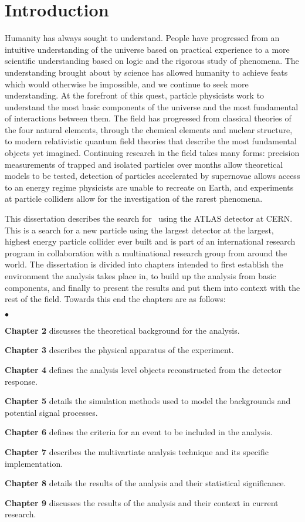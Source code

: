 \chapter{Introduction}
\label{SECTION-INTRO}
Humanity has always sought to understand. People have progressed from an intuitive understanding of the universe based on practical experience to a more scientific understanding based on logic and the rigorous study of phenomena. The understanding brought about by science has allowed humanity to achieve feats which would otherwise be impossible, and we continue to seek more understanding. At the forefront of this quest, particle physicists work to understand the most basic components of the universe and the most fundamental of interactions between them. The field has progressed from classical theories of the four natural elements, through the chemical elements and nuclear structure, to modern relativistic quantum field theories that describe the most fundamental objects yet imagined. Continuing research in the field takes many forms: precision measurements of trapped and isolated particles over months allow theoretical models to be tested, detection of particles accelerated by supernovae allows access to an energy regime physicists are unable to recreate on Earth, and experiments at particle colliders allow for the investigation of the rarest phenomena.

This dissertation describes the search for \Wprimechan\ using the ATLAS detector at CERN. This is a search for a new particle using the largest detector at the largest, highest energy particle collider ever built and is part of an international research program in collaboration with a multinational research group from around the world. The dissertation is divided into chapters intended to first establish the environment the analysis takes place in, to build up the analysis from basic components, and finally to present the results and put them into context with the rest of the field. Towards this end the chapters are as follows:

\begin{list}{$\bullet$}{}
\item \textbf{Chapter 2} discusses the theoretical background for the analysis.
\item \textbf{Chapter 3} describes the physical apparatus of the experiment.
\item \textbf{Chapter 4} defines the analysis level objects reconstructed from the detector response.
\item \textbf{Chapter 5} details the simulation methods used to model the backgrounds and potential signal processes.
\item \textbf{Chapter 6} defines the criteria for an event to be included in the analysis.
\item \textbf{Chapter 7} describes the multivartiate analysis technique and its specific implementation.
\item \textbf{Chapter 8} details the results of the analysis and their statistical significance.
\item \textbf{Chapter 9} discusses the results of the analysis and their context in current research.
\end{list}

